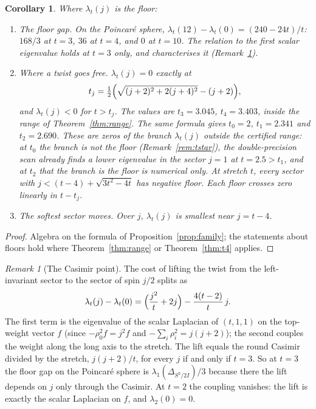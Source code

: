 \documentclass[11pt]{article}
\newtheorem{corollary}[theorem]{Corollary}
\theoremstyle{definition}
\theoremstyle{remark}
\newtheorem{remark}[theorem]{Remark}
\begin{document}
\begin{corollary}\label{cor:family}
Where $\lambda_t(j)$ is the floor:
\begin{enumerate}
  \item \emph{The floor gap.} On the Poincar\'e sphere, $\lambda_t(12)-\lambda_t(0)=(240-24t)/t$: $168/3$ at
    $t=3$, $36$ at $t=4$, and $0$ at $t=10$. The relation to the first scalar eigenvalue holds at $t=3$
    only, and characterises it (Remark~\ref{rem:casimir}).
  \item \emph{Where a twist goes free.} $\lambda_t(j)=0$ exactly at
    \[
      t_j=\tfrac12\Bigl(\sqrt{(j+2)^2+2(j+4)^2}-(j+2)\Bigr),
    \]
    and $\lambda_t(j)<0$ for $t>t_j$. The values are $t_3=3.045$,
    $t_4=3.403$, inside the range of Theorem~\ref{thm:range}. The same formula gives $t_0=2$,
    $t_1=2.341$ and $t_2=2.690$. These are zeros of the branch $\lambda_t(j)$ outside the certified range: at
    $t_0$ the branch is not the floor (Remark~\ref{rem:tstar}), the double-precision scan already finds a lower
    eigenvalue in the sector $j=1$ at $t=2.5>t_1$, and at $t_2$ that the branch is the floor is numerical only. At stretch
    $t$, every sector with $j<(t-4)+\sqrt{3t^2-4t}$ has negative floor. Each floor crosses zero linearly in
    $t-t_j$.
  \item \emph{The softest sector moves.} Over $j$, $\lambda_t(j)$ is smallest near $j=t-4$.
\end{enumerate}
\end{corollary}
\begin{proof}
Algebra on the formula of Proposition~\ref{prop:family}; the statements about floors hold where
Theorem~\ref{thm:range} or Theorem~\ref{thm:t4} applies.
\end{proof}

\begin{remark}[The Casimir point]\label{rem:casimir}
The cost of lifting the twist from the left-invariant sector to the sector of spin $j/2$ splits as
\[
  \lambda_t(j)-\lambda_t(0)=\Bigl(\frac{j^2}{t}+2j\Bigr)-\frac{4(t-2)}{t}\,j .
\]
The first term is the eigenvalue of the scalar Laplacian of $(t,1,1)$ on the top-weight vector $f$
(since $-\rho_0^2f=j^2f$ and $-\sum_i\rho_i^2=j(j+2)$); the second couples the weight along the long axis to the
stretch. The lift equals the round Casimir divided by the stretch, $j(j+2)/t$, for every $j$ if and only if
$t=3$. So at $t=3$ the floor gap on the Poincar\'e sphere is $\lambda_1(\Delta_{S^3/2I})/3$ because there the
lift depends on $j$ only through the Casimir. At $t=2$ the coupling vanishes: the lift is exactly the scalar
Laplacian on $f$, and $\lambda_2(0)=0$.
\end{remark}
\end{document}
